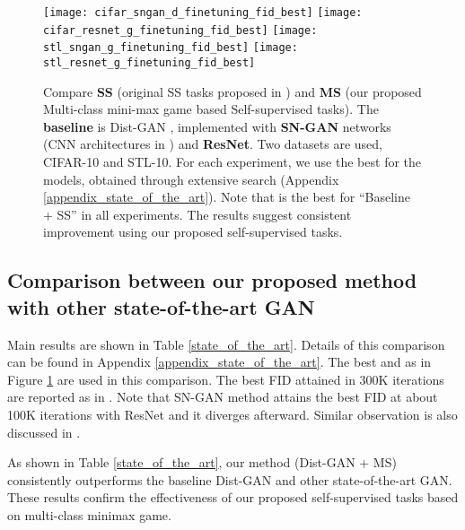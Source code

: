 \documentclass{article}
\begin{document}
\begin{figure}
  \centering
\texttt{[image: cifar\_sngan\_d\_finetuning\_fid\_best]}
  \texttt{[image: cifar\_resnet\_g\_finetuning\_fid\_best]}
  \texttt{[image: stl\_sngan\_g\_finetuning\_fid\_best]}
  \texttt{[image: stl\_resnet\_g\_finetuning\_fid\_best]}
\caption{Compare {\bf SS} (original SS tasks proposed in \cite{chen-arxiv-2018}) and {\bf MS} (our proposed Multi-class mini-max game based Self-supervised tasks). The {\bf baseline} is Dist-GAN \cite{tran-eccv-2018}, implemented with {\bf SN-GAN} networks (CNN architectures in \cite{miyato-iclr-2018}) and {\bf ResNet}. Two datasets are used, CIFAR-10 and STL-10. For each experiment, we use the best  for the models, obtained through extensive search (Appendix \ref{appendix_state_of_the_art}). Note that  is the best for ``Baseline + SS'' in all experiments. The results suggest consistent improvement using our proposed self-supervised tasks.
}
  \label{ss_d_g_finetuning_all}
\end{figure}




















\subsection{Comparison between our proposed method with other state-of-the-art GAN}

Main results are shown in Table \ref{state_of_the_art}. Details of this comparison can be found in Appendix \ref{appendix_state_of_the_art}. The best   and  as in Figure \ref{ss_d_g_finetuning_all} are used in this comparison.
The best FID attained in 300K iterations are reported as in \cite{xiang-arxiv-2017, li-nips-2017, tran-eccv-2018, yazici-arxiv-2018}.
Note that SN-GAN method \cite{miyato-iclr-2018} attains the best FID at about 100K iterations with ResNet and it diverges afterward. Similar observation is also discussed in \cite{chen-arxiv-2018}. 

As shown in Table \ref{state_of_the_art}, our method (Dist-GAN + MS) consistently outperforms the baseline Dist-GAN and other state-of-the-art GAN. These results confirm the effectiveness of our proposed self-supervised tasks based on multi-class minimax game.
\end{document}
